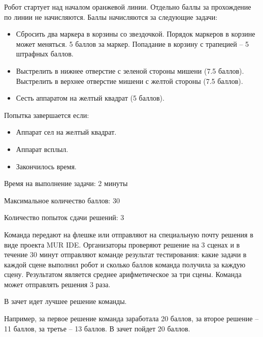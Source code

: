 

Робот стартует над началом оранжевой линии. Отдельно баллы за прохождение по линии не начисляются. 
Баллы начисляются за следующие задачи:
\begin{itemize}
    \item Сбросить два маркера в корзины со звездочкой. Порядок маркеров в корзине может меняться. 5 баллов за маркер. Попадание в корзину с трапецией – 5 штрафных баллов. 
    \item Выстрелить в нижнее отверстие с зеленой стороны мишени (7.5 баллов). Выстрелить в верхнее отверстие мишени с желтой стороны (7.5 баллов). 
    \item Сесть аппаратом на желтый квадрат (5 баллов). 
\end{itemize}

Попытка завершается если:
\begin{itemize}
    \item Аппарат сел на желтый квадрат.
    \item Аппарат всплыл.
    \item Закончилось время.
\end{itemize}

Время на выполнение задачи: 2 минуты

Максимальное количество баллов: 30

Количество попыток сдачи решений: 3

\markSection

Команда передают на флешке или отправляют на специальную почту решения в виде проекта MUR IDE. Организаторы проверяют решение на 3 сценах и в течение 30 минут отправляют команде результат тестирования: какие задачи в каждой сцене выполнил робот и сколько баллов команда получила за каждую сцену. Результатом является среднее арифметическое за три сцены. Команда может отправлять решения 3 раза.  

В зачет идет лучшее решение команды. 

Например, за первое решение команда заработала 20 баллов, за второе решение – 11 баллов, за третье – 13 баллов. В зачет пойдет 20 баллов.
